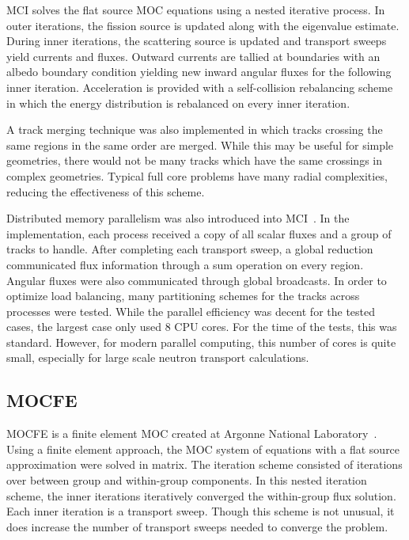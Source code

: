 MCI solves the flat source \ac{MOC} equations using a nested iterative process. In outer iterations, the fission source is updated along with the eigenvalue estimate. During inner iterations, the scattering source is updated and transport sweeps yield currents and fluxes. Outward currents are tallied at boundaries with an albedo boundary condition yielding new inward angular fluxes for the following inner iteration. Acceleration is provided with a self-collision rebalancing scheme in which the energy distribution is rebalanced on every inner iteration.

A track merging technique was also implemented in which tracks crossing the same regions in the same order are merged. While this may be useful for simple geometries, there would not be many tracks which have the same crossings in complex geometries. Typical full core problems have many radial complexities, reducing the effectiveness of this scheme.

Distributed memory parallelism was also introduced into MCI~\cite{dragon_parallel}. In the implementation, each process received a copy of all scalar fluxes and a group of tracks to handle. After completing each transport sweep, a global reduction communicated flux information through a sum operation on every region. Angular fluxes were also communicated through global broadcasts. In order to optimize load balancing, many partitioning schemes for the tracks across processes were tested. While the parallel efficiency was decent for the tested cases, the largest case only used 8 CPU cores. For the time of the tests, this was standard. However, for modern parallel computing, this number of cores is quite small, especially for large scale neutron transport calculations.

\subsection{MOCFE}
\label{sec:mocfe}

MOCFE is a finite element \ac{MOC} created at Argonne National Laboratory~\cite{mocfe_init}. Using a finite element approach, the \ac{MOC} system of equations with a flat source approximation were solved in matrix. The iteration scheme consisted of iterations over between group and within-group components. In this nested iteration scheme, the inner iterations iteratively converged the within-group flux solution. Each inner iteration is a transport sweep. Though this scheme is not unusual, it does increase the number of transport sweeps needed to converge the problem.

